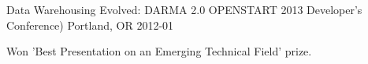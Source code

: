 


\begin{cventries}

  \cventry
    {Data Warehousing Evolved: DARMA 2.0} %
    {OPENSTART 2013 Developer's Conference)} %
    {Portland, OR} %
    {2012-01} %
    {
      \begin{cvitems} %
        \item {Won 'Best Presentation on an Emerging Technical Field' prize.}
      \end{cvitems}
    }


\end{cventries}

